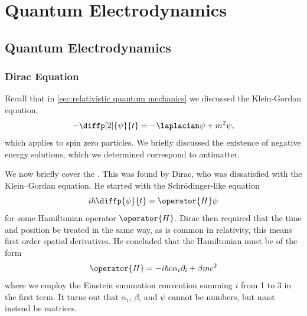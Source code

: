 \documentclass[fleqn]{NotesClass}
\begin{document}
    \part{Quantum Electrodynamics}
    \chapter{Quantum Electrodynamics}
    \section{Dirac Equation}
    Recall that in \cref{sec:relativistic quantum mechanics} we discussed the Klein-Gordan equation,
    \begin{equation}
        -\diffp[2]{\psi}{t} = -\laplacian\psi + m^2\psi,
    \end{equation}
    which applies to spin zero particles.
    We briefly discussed the existence of negative energy solutions, which we determined correspond to antimatter.
    
    We now briefly cover the .
    This was found by Dirac, who was dissatisfied with the Klein--Gordan equation.
    He started with the Schr\"odinger-like equation
    \begin{equation}
        i\hbar \diffp{\psi}{t} = \operator{H}\psi
    \end{equation}
    for some Hamiltonian operator \(\operator{H}\).
    Dirac then required that the time and position be treated in the same way, as is common in relativity, this means first order spatial derivatives.
    He concluded that the Hamiltonian must be of the form
    \begin{equation}
        \operator{H} = -i\hbar c\alpha_i\partial_i + \beta mc^2
    \end{equation}
    where we employ the Einstein summation convention summing \(i\) from 1 to 3 in the first term.
    It turns out that \(\alpha_i\), \(\beta\), and \(\psi\) cannot be numbers, but must instead be matrices.
    
\end{document}
